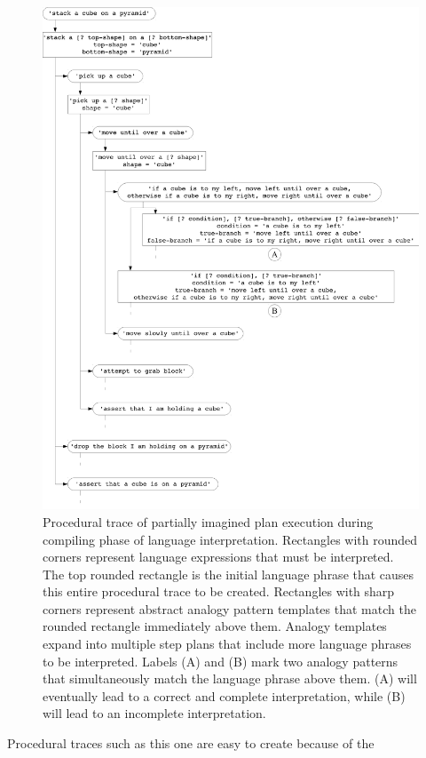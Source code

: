 \begin{figure}
\centering
\includegraphics[width=12cm]{gfx/compile_natural_language}
\caption[Procedural trace of partially imagined plan execution during
  compiling phase of language interpretation.]{Procedural trace of
  partially imagined plan execution during compiling phase of language
  interpretation.  Rectangles with rounded corners represent language
  expressions that must be interpreted.  The top rounded rectangle is
  the initial language phrase that causes this entire procedural trace
  to be created.  Rectangles with sharp corners represent abstract
  analogy pattern templates that match the rounded rectangle
  immediately above them.  Analogy templates expand into multiple step
  plans that include more language phrases to be interpreted.  Labels
  (A) and (B) mark two analogy patterns that simultaneously match the
  language phrase above them.  (A) will eventually lead to a correct
  and complete interpretation, while (B) will lead to an incomplete
  interpretation.}
\label{figure:compile_natural_language}
\end{figure}
Procedural traces such as this one are easy to create because of the

